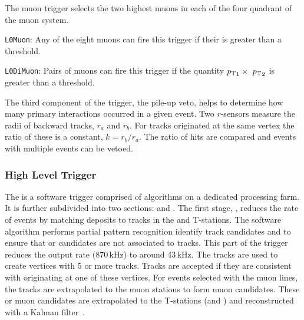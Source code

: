 The \lone muon trigger selects the two highest \pt muons in each of the four quadrant of the muon system. 
\begin{description}
\item \texttt{L0Muon}: Any of the eight muons can fire this trigger if their \pt is greater than a threshold.
\item \texttt{L0DiMuon}: Pairs of muons can fire this trigger if the quantity $\mbox{$p_{\mathrm{ T}}$}_{1} \times\ \mbox{$p_{\mathrm{ T}}$}_{2}$ is greater than a threshold.
\end{description}

The third component of the \lone trigger, the pile-up veto, helps to determine how many primary interactions occurred in a given event. Two \velo $r$-sensors measure the radii of backward tracks, $r_{a}$ and $r_{b}$. For tracks originated at the same vertex the ratio of these is a constant, $k = r_{b}/r_{a}$. The ratio of hits are compared and events with multiple events can be vetoed. 

\subsubsection{High Level Trigger}

The \hlt is a software trigger comprised of \cpp algorithms on a dedicated processing farm. It is further subdivided into two sections: \hltone and \hlttwo. 
The first stage, \hltone, reduces the rate of events by matching \lone deposits to tracks in the \velo and T-stations. The software algorithm performs partial pattern recognition identify track candidates and to ensure that \Pgamma or \piz \lone candidates are not associated to tracks. This part of the trigger reduces the \lone output rate (870\,kHz) to around 43\,kHz.
The \velo tracks are used to create vertices with 5 or more tracks. Tracks are accepted if they are consistent with originating at one of these vertices. For events selected with the muon \lone lines, the \velo tracks are extrapolated to the muon stations to form muon candidates. These \velo or muon candidates are extrapolated to the T-stations (\ot and \intr) and reconstructed with a Kalman filter~\cite{Kalmanone,FRUHWIRTH1987444}.




